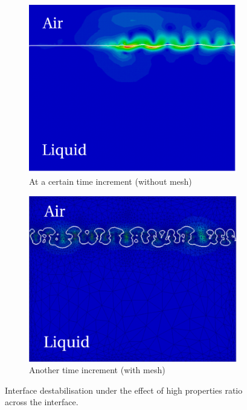 \begin{figure}[htbp]
\centering
 \begin{subfigure}[t]{0.4\textwidth}
    \centering
	\includegraphics[width=\textwidth]{Chapter4/Graphics/UnstableInterface1.pdf}
	\caption{At a certain time increment (without mesh)}
    \label{fig:UnstableInterface1}
  \end{subfigure}
\qquad
 \begin{subfigure}[t]{0.4\textwidth}
    \centering
	\includegraphics[width=\textwidth]{Chapter4/Graphics/UnstableInterface2.pdf}
	\caption{Another time increment (with mesh)}
    \label{fig:UnstableInterface2}
  \end{subfigure}
\caption{Interface destabilisation under the effect of high properties ratio across the interface.}
\end{figure}
